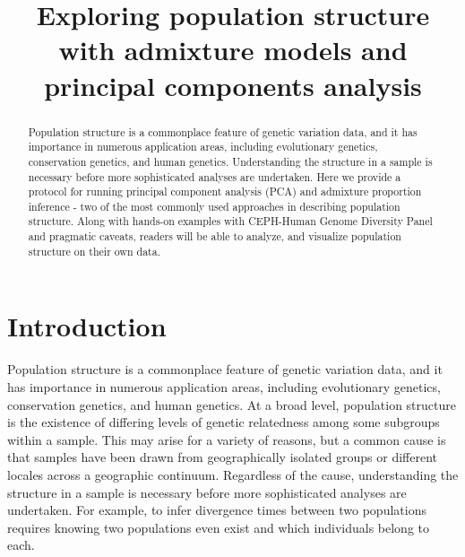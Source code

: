 \documentclass[smallextended]{svmult}       %
\begin{document}
\title{Exploring population structure with admixture models and principal
components analysis }







\maketitle

\begin{abstract}
Population structure is a commonplace feature of genetic variation data,
and it has importance in numerous application areas, including
evolutionary genetics, conservation genetics, and human genetics.
Understanding the structure in a sample is necessary before more
sophisticated analyses are undertaken. Here we provide a protocol for
running principal component analysis (PCA) and admixture proportion
inference - two of the most commonly used approaches in describing
population structure. Along with hands-on examples with CEPH-Human
Genome Diversity Panel and pragmatic caveats, readers will be able to
analyze, and visualize population structure on their own data.
\end{abstract}




\def\spacingset#1{\renewcommand{\baselinestretch}%
{#1}\small\normalsize} \spacingset{1}


\section{Introduction}\label{introduction}

Population structure is a commonplace feature of genetic variation data,
and it has importance in numerous application areas, including
evolutionary genetics, conservation genetics, and human genetics. At a
broad level, population structure is the existence of differing levels
of genetic relatedness among some subgroups within a sample. This may
arise for a variety of reasons, but a common cause is that samples have
been drawn from geographically isolated groups or different locales
across a geographic continuum. Regardless of the cause, understanding
the structure in a sample is necessary before more sophisticated
analyses are undertaken. For example, to infer divergence times between
two populations requires knowing two populations even exist and which
individuals belong to each.
\end{document}
